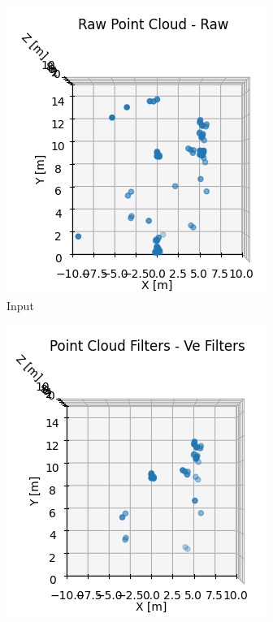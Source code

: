 \begin{figure}[!htbp]
\centering
\begin{subfigure}{0.24\textwidth}
  \centering
  \includegraphics[width=\textwidth]{images/withoutVeFilter.png}
  \caption{Input}
\end{subfigure}
\begin{subfigure}{0.24\textwidth}
  \centering
  \includegraphics[width=\textwidth]{images/wVeFilter.png}

\end{subfigure}
\end{figure}
